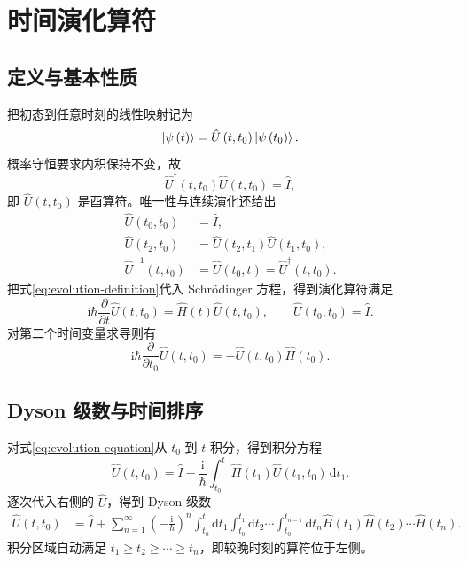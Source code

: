 \section{时间演化算符}
\subsection{定义与基本性质}
把初态到任意时刻的线性映射记为
\begin{equation}
\Ket{\psi\left(t\right)}=\hat U\left(t,t_0\right)\Ket{\psi\left(t_0\right)}.
\label{eq:evolution-definition}
\end{equation}
概率守恒要求内积保持不变，故
\begin{equation}
\hat U^\dagger\left(t,t_0\right)\hat U\left(t,t_0\right)=\hat I,
\end{equation}
即 $\hat U\left(t,t_0\right)$ 是酉算符。唯一性与连续演化还给出
\begin{align}
\hat U\left(t_0,t_0\right)&=\hat I,\\
\hat U\left(t_2,t_0\right)&=\hat U\left(t_2,t_1\right)\hat U\left(t_1,t_0\right),\\
\hat U^{-1}\left(t,t_0\right)&=\hat U\left(t_0,t\right)=\hat U^\dagger\left(t,t_0\right).
\end{align}
把式\eqref{eq:evolution-definition}代入 Schr\"odinger 方程，得到演化算符满足
\begin{equation}
\boxed{\mathrm{i}\hbar\frac{\partial}{\partial t}\hat U\left(t,t_0\right)
=\hat H\left(t\right)\hat U\left(t,t_0\right),
\qquad \hat U\left(t_0,t_0\right)=\hat I.}
\label{eq:evolution-equation}
\end{equation}
对第二个时间变量求导则有
\begin{equation}
\mathrm{i}\hbar\frac{\partial}{\partial t_0}\hat U\left(t,t_0\right)
=-\hat U\left(t,t_0\right)\hat H\left(t_0\right).
\end{equation}

\subsection{Dyson 级数与时间排序}
对式\eqref{eq:evolution-equation}从 $t_0$ 到 $t$ 积分，得到积分方程
\begin{equation}
\hat U\left(t,t_0\right)=\hat I-\frac{\mathrm{i}}{\hbar}
\int_{t_0}^{t}\hat H\left(t_1\right)\hat U\left(t_1,t_0\right)\,\mathrm{d}t_1.
\end{equation}
逐次代入右侧的 $\hat U$，得到 Dyson 级数
\begin{align}
\hat U\left(t,t_0\right)
&=\hat I+\sum_{n=1}^{\infty}\left(-\frac{\mathrm{i}}{\hbar}\right)^n
\int_{t_0}^{t}\mathrm{d}t_1\int_{t_0}^{t_1}\mathrm{d}t_2\cdots
\int_{t_0}^{t_{n-1}}\mathrm{d}t_n
\hat H\left(t_1\right)\hat H\left(t_2\right)\cdots\hat H\left(t_n\right).
\label{eq:dyson-series}
\end{align}
积分区域自动满足 $t_1\geq t_2\geq\cdots\geq t_n$，即较晚时刻的算符位于左侧。

